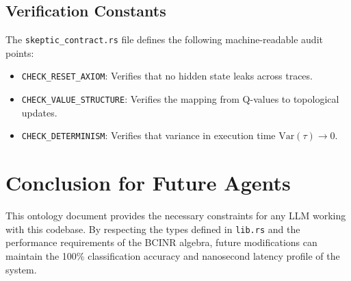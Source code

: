 \documentclass[12pt,a4paper]{report}
\begin{document}
\section{Verification Constants}
The \texttt{skeptic\_contract.rs} file defines the following machine-readable audit points:
\begin{itemize}
    \item \texttt{CHECK\_RESET\_AXIOM}: Verifies that no hidden state leaks across traces.
    \item \texttt{CHECK\_VALUE\_STRUCTURE}: Verifies the mapping from Q-values to topological updates.
    \item \texttt{CHECK\_DETERMINISM}: Verifies that variance in execution time $\text{Var}(\tau) \to 0$.
\end{itemize}

\chapter{Conclusion for Future Agents}
This ontology document provides the necessary constraints for any LLM working with this codebase. By respecting the types defined in \texttt{lib.rs} and the performance requirements of the BCINR algebra, future modifications can maintain the 100\% classification accuracy and nanosecond latency profile of the system.
\end{document}
